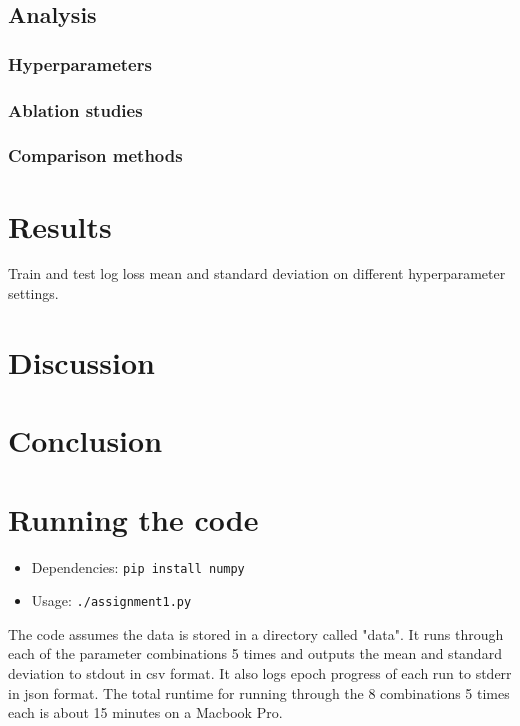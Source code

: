 \documentclass{article}
\begin{document}
\subsection{Analysis}
\subsubsection{Hyperparameters}
\subsubsection{Ablation studies}
\subsubsection{Comparison methods}

\section{Results}
\begin{table}\pgfplotstabletypeset[
    every head row/.style={after row=\hline},
]{\results}\caption{
  Train and test log loss mean and standard deviation on different hyperparameter settings.
  \label{tab:results}
}\end{table}

\section{Discussion}

\section{Conclusion}

\appendix
\section{Running the code}
\begin{itemize}
\item Dependencies: \texttt{pip install numpy}
\item Usage: \texttt{./assignment1.py}
\end{itemize}
The code assumes the data is stored in a directory called "data". It runs through each of the parameter combinations 5 times and outputs the mean and standard deviation to stdout in csv format. It also logs epoch progress of each run to stderr in json format. The total runtime for running through the 8 combinations 5 times each is about 15 minutes on a Macbook Pro.
\end{document}
